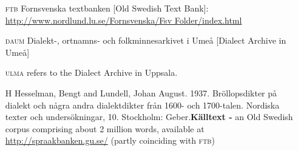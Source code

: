 \begin{itemize}
\item[\textsc{ftb}]
  Fornsvenska textbanken [Old Swedish Text Bank]: \url{http://www.nordlund.lu.se/Fornsvenska/Fsv Folder/index.html} 

\item[\textsc{daum}]
  Dialekt-, ortnamns- och folkminnesarkivet i Umeå [Dialect Archive in Umeå] 

\item[\textsc{ulma}]
 refers to the Dialect Archive in Uppsala. 

\item[H]
  Hesselman, Bengt and Lundell, Johan August. 1937. Bröllopsdikter på dialekt och några andra dialektdikter från 1600- och 1700-talen. Nordiska texter och undersökningar, 10. Stockholm: Geber.\textbf{Källtext - }an Old Swedish corpus comprising about 2 million words, available at \url{http://spraakbanken.gu.se/} (partly coinciding with \textsc{ftb})
\end{itemize}